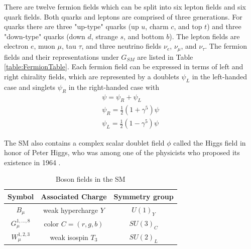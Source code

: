There are twelve fermion fields which can be split into six lepton fields and six quark fields.  Both quarks and leptons are comprised of three generations.  For quarks there are three "up-type" quarks (up $u$, charm $c$, and top $t$) and three "down-type" quarks (down $d$, strange $s$, and bottom $b$).  The lepton fields are electron $e$, muon $\mu$, tau $\tau$, and three neutrino fields $\nu_e$, $\nu_\mu$, and $\nu_\tau$.  The fermion fields and their representations under $G_{SM}$ are listed in Table \ref{table:FermionTable}.  Each fermion field can be expressed in terms of left and right chirality fields, which are represented by a doublets $\psi_L$ in the left-handed case and singlets $\psi_R$ in the right-handed case with
\
\begin{eqnarray}
	\psi = \psi_R + \psi_L \\
	\psi_R = \frac{1}{2}(1+\gamma^5)\psi \\
	\psi_L = \frac{1}{2}(1-\gamma^5)\psi  
\end{eqnarray}

The SM also contains a complex scalar doublet field $\phi$ called the Higgs field in honor of Peter Higgs, who was among one of the physicists who proposed its existence in 1964 \cite{Higgs:1964pj}.  

\begin{table}[h!]
	\centering
	\caption{Boson fields in the SM}
	\begin{tabular}{|c|c|c|}
		\hline
		Symbol & Associated Charge & Symmetry group \\
		\hline
		\hline
		$B_\mu$ & weak hypercharge $Y$ & $U(1)_Y$\\
		\hline
		$G_{\mu}^{1,...,8}$ & color $C=(r,g,b)$ & $SU(3)_C$ \\
		\hline
		$W_{\mu}^{1,2,3}$ & weak isospin $T_3$ & $SU(2)_L$ \\
		\hline
	\end{tabular}
	\label{table:BosonFields}
\end{table}



